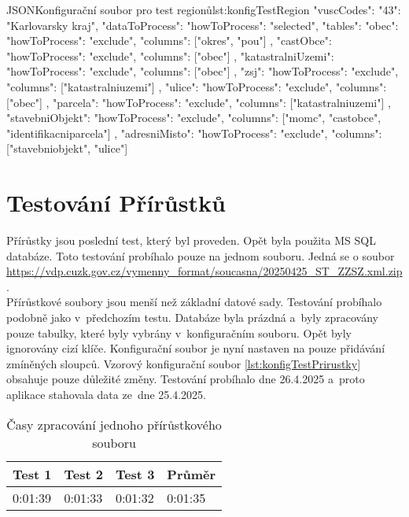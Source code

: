 \begin{code}{JSON}{Konfigurační soubor pro test regionů}{lst:konfigTestRegion}
  {
    "vuscCodes": {"43": "Karlovarsky kraj"},
    "dataToProcess": {
      "howToProcess": "selected",
      "tables": {
        "obec": {
          "howToProcess": "exclude",
          "columns": ["okres", "pou"]
        },
        "castObce": {
          "howToProcess": "exclude",
          "columns": ["obec"]
        },
        "katastralniUzemi": {
          "howToProcess": "exclude",
          "columns": ["obec"]
        },
        "zsj": {
          "howToProcess": "exclude",
          "columns": ["katastralniuzemi"]
        },
        "ulice": {
          "howToProcess": "exclude",
          "columns": ["obec"]
        },
        "parcela": {
          "howToProcess": "exclude",
          "columns": ["katastralniuzemi"]
        },
        "stavebniObjekt": {
          "howToProcess": "exclude",
          "columns": ["momc", "castobce", "identifikacniparcela"]
        },
        "adresniMisto": {
          "howToProcess": "exclude",
          "columns": ["stavebniobjekt", "ulice"]
        }
      }
    }
  }
\end{code}

\newpage

\section{Testování Přírůstků}
Přírůstky jsou poslední test, který byl proveden.
Opět byla použita MS SQL databáze. Toto testování probíhalo pouze na jednom souboru.
Jedná se o soubor \url{https://vdp.cuzk.gov.cz/vymenny_format/soucasna/20250425_ST_ZZSZ.xml.zip}. \\
Přírůstkové soubory jsou menší než základní datové sady.
Testování probíhalo podobně jako v~předchozím testu.
Databáze byla prázdná a~byly zpracovány pouze tabulky, které byly vybrány v~konfiguračním souboru.
Opět byly ignorovány cizí klíče. Konfigurační soubor je nyní nastaven na pouze přidávání zmíněných sloupců.
Vzorový konfigurační soubor \ref{lst:konfigTestPrirustky} obsahuje pouze důležité změny.
Testování probíhalo dne 26.4.2025 a~proto aplikace stahovala data ze~dne 25.4.2025.

\begin{table}[!h]
  \centering
  \caption{Časy zpracování jednoho přírůstkového souboru}
  \label{tab:test3}
  \begin{tabular}{|l|l|l|l|}
  \hline
  \textbf{Test 1} & \textbf{Test 2} & \textbf{Test 3} & \textbf{Průměr} \\ \hline
  0:01:39         & 0:01:33         & 0:01:32         & 0:01:35         \\ \hline
  \end{tabular}
\end{table}

